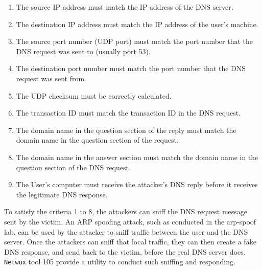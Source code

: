 \begin{enumerate}

\item The source IP address must match the IP address of the DNS server.

\item The destination IP address must match the IP address of the user's machine.

\item The source port number (UDP port) must match the port number that the DNS
request was sent to (usually port 53).

\item The destination port number must match the port number that the DNS
request was sent from.

\item The UDP checksum must be correctly calculated. 

\item The transaction ID must match the transaction ID in the DNS request.

\item The domain name in the question section of the reply must match the 
domain name in the question section of the request.

\item The domain name in the answer section must match the domain name in the
question section of the DNS request.

\item The User's computer must receive the attacker's DNS reply before it
receives the legitimate DNS response.
\end{enumerate}


To satisfy the criteria 1 to 8, the attackers can sniff the DNS request message
sent by the victim.  An ARP spoofing attack, such as conducted in the arp-spoof
lab, can be used by the attacker to sniff traffic between the user and the 
DNS server.  Once the attackers can sniff that local traffic,
they can then create a fake DNS response, and send back to the victim,
before the real DNS server does. {\tt Netwox} tool 105 provide a utility to conduct
such sniffing and responding.

